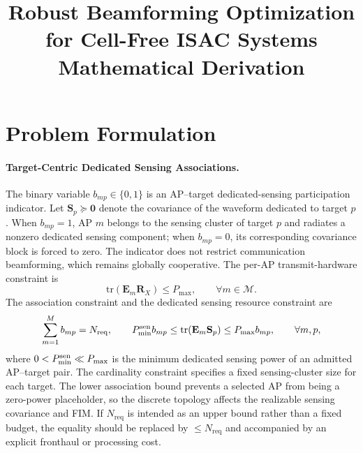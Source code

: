 \documentclass[12pt,a4paper]{article}
\title{\textbf{Robust Beamforming Optimization for Cell-Free ISAC Systems\\Mathematical Derivation}}
\author{}
\date{}
\newcommand{\mat}[1]{\mathbf{#1}}
\newcommand{\tr}{\text{tr}}
\begin{document}
\maketitle

\section{Problem Formulation}\label{sec:formulation}

\paragraph{Target-Centric Dedicated Sensing Associations.}
The binary variable $b_{mp}\in\{0,1\}$ is an AP--target dedicated-sensing participation indicator. Let $\mat{S}_p\succeq\mat{0}$ denote the covariance of the waveform dedicated to target $p$. When $b_{mp}=1$, AP $m$ belongs to the sensing cluster of target $p$ and radiates a nonzero dedicated sensing component; when $b_{mp}=0$, its corresponding covariance block is forced to zero. The indicator does not restrict communication beamforming, which remains globally cooperative. The per-AP transmit-hardware constraint is
\begin{equation}
    \tr(\mat{E}_m\mat{R}_X)\leq P_{\max},\qquad \forall m\in\mathcal{M}.
\end{equation}
The association constraint and the dedicated sensing resource constraint are
\begin{equation}
\sum_{m=1}^{M}b_{mp}=N_{\mathrm{req}},\qquad
P_{\min}^{\rm sen}b_{mp}\leq\tr(\mat{E}_m\mat{S}_p)\leq P_{\max}b_{mp},\qquad \forall m,p,
\end{equation}
where $0<P_{\min}^{\rm sen}\ll P_{\max}$ is the minimum dedicated sensing power of an admitted AP--target pair. The cardinality constraint specifies a fixed sensing-cluster size for each target. The lower association bound prevents a selected AP from being a zero-power placeholder, so the discrete topology affects the realizable sensing covariance and FIM. If $N_{\mathrm{req}}$ is intended as an upper bound rather than a fixed budget, the equality should be replaced by $\leq N_{\mathrm{req}}$ and accompanied by an explicit fronthaul or processing cost.
\end{document}
